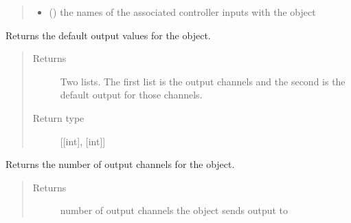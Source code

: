 \documentclass[letterpaper,10pt,english]{sphinxmanual}
\begin{document}
\begin{fulllineitems}
\begin{fulllineitems}
\begin{quote}
\begin{description}
\begin{itemize}
\item {} 
\sphinxAtStartPar
{} (\sphinxstyleliteralemphasis{\sphinxupquote{{[}}}\sphinxstyleliteralemphasis{\sphinxupquote{{]}}}) \textendash{} the names of the associated controller inputs with 
the object

\end{itemize}

\end{description}\end{quote}

\end{fulllineitems}


\begin{fulllineitems}
\label{\detokenize{specific:NeckTiltOutput.NeckTiltOutput.get_default_outputs}}
\sphinxAtStartPar
Returns the default output values for the object.
\begin{quote}\begin{description}
\item[{Returns}] \leavevmode
\sphinxAtStartPar
Two lists. The first list is the output channels and the second 
is the default output for those channels.

\item[{Return type}] \leavevmode
\sphinxAtStartPar
{[}{[}int{]}, {[}int{]}{]}

\end{description}\end{quote}

\end{fulllineitems}


\begin{fulllineitems}
\label{\detokenize{specific:NeckTiltOutput.NeckTiltOutput.get_num_channels}}
\sphinxAtStartPar
Returns the number of output channels for the object.
\begin{quote}\begin{description}
\item[{Returns}] \leavevmode
\sphinxAtStartPar
number of output channels the object sends output to


\end{description}
\end{quote}
\end{fulllineitems}
\end{fulllineitems}
\end{document}

